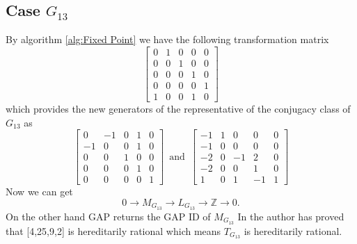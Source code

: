 \documentclass{article}
\theoremstyle{plain}
\theoremstyle{definition}
\newcommand{\Z}{\ensuremath{\mathbb{Z}}}
\newcommand{\tand}{\ensuremath{\,\,\, \text{and} \,\,\,}}
\newcommand{\exactseq}[1]{\ensuremath{0 \longrightarrow M_{#1} \longrightarrow L_{#1} \longrightarrow \Z \longrightarrow 0}}
\begin{document}
\subsection{Case $G_{13}$}
By algorithm \ref{alg:Fixed Point} we have the following transformation matrix 
$$
\left[ \begin {array}{ccccc} 0&1&0&0&0\\ 0&0&1&0&0
\\ 0&0&0&1&0\\ 0&0&0&0&1
\\ 1&0&0&1&0\end {array} \right] 
$$
which provides the new generators of the representative of the conjugacy class of $G_{13}$ as
$$
\left[ \begin {array}{cccc|c} 0&-1&0&1&0\\  -1&0&0&1&0
\\  0&0&1&0&0\\  0&0&0&1&0
\\  \hline 0&0&0&0&1\end {array} \right] 
\tand
 \left[ \begin {array}{cccc|c} -1&1&0&0&0\\  -1&0&0&0&0
\\  -2&0&-1&2&0\\  -2&0&0&1&0
\\ \hline  1&0&1&-1&1\end {array} \right] 
$$
Now we can get 
$$\exactseq{G_{13}}.$$
On the other hand GAP returns the GAP ID of $M_{G_{13}}$ 
In \cite{Nicole1} the author has proved that [4,25,9,2] is hereditarily rational which means $T_{G_{13}}$ is hereditarily rational.
\end{document}
